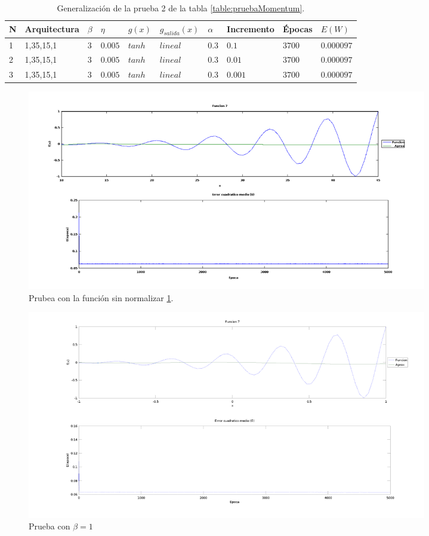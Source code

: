 \documentclass[11pt,a4paper]{article}
\begin{document}
{\begin{table}[ht]
\centering
\begin{tabular}{|l|l|l|l|l|l|l|l|l|l|}
\hline
N & Arquitectura & $\beta$ & $\eta$ & $g(x)$ & $g_{salida}(x)$ & $\alpha$ & Incremento & Épocas & $E(W)$ \\ \hline
1 & 1,35,15,1    & $3$    & $0.005$ & $tanh$ & $lineal$      & $0.3$   & $0.1$       & $3700$   & $0.000097$ \\ \hline
2 & 1,35,15,1    & $3$    & $0.005$ & $tanh$ & $lineal$      & $0.3$   & $0.01$       & $3700$   & $0.000097$ \\ \hline
3 & 1,35,15,1    & $3$    & $0.005$ & $tanh$ & $lineal$      & $0.3$   & $0.001$      & $3700$   & $0.000097$ \\ \hline
\end{tabular}
\caption{Generalización de la prueba 2 de la tabla \ref{table:pruebaMomentum}.}
\label{table:gen}
\end{table}

\begin{figure}[ht]
\centering
\includegraphics[width=0.85\textwidth]{img/sinNormalizar.png}
\caption{\label{fig:sinNormalizar} Prubea con la función sin normalizar \ref{table:gen}.}
\end{figure}

\begin{figure}[ht]
\centering
\includegraphics[width=0.85\textwidth]{img/PruebaRecu11.png}
\caption{\label{fig:PruebaRecu11} Prueba con $\beta = 1$}
\end{figure}

}
\end{document}
